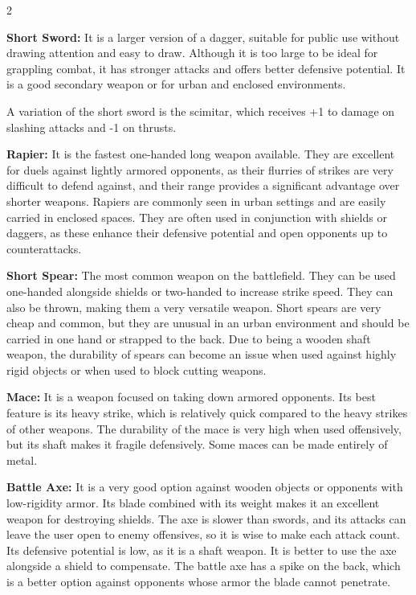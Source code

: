 \begin{multicols}{2}

\textbf{Short Sword:} It is a larger version of a dagger, suitable for public use without drawing attention and easy to draw. Although it is too large to be ideal for grappling combat, it has stronger attacks and offers better defensive potential. It is a good secondary weapon or for urban and enclosed environments. 

A variation of the short sword is the scimitar, which receives +1 to damage on slashing attacks and -1 on thrusts.

\textbf{Rapier:} It is the fastest one-handed long weapon available. They are excellent for duels against lightly armored opponents, as their flurries of strikes are very difficult to defend against, and their range provides a significant advantage over shorter weapons. Rapiers are commonly seen in urban settings and are easily carried in enclosed spaces. They are often used in conjunction with shields or daggers, as these enhance their defensive potential and open opponents up to counterattacks.

\textbf{Short Spear:} The most common weapon on the battlefield. They can be used one-handed alongside shields or two-handed to increase strike speed. They can also be thrown, making them a very versatile weapon. Short spears are very cheap and common, but they are unusual in an urban environment and should be carried in one hand or strapped to the back. Due to being a wooden shaft weapon, the durability of spears can become an issue when used against highly rigid objects or when used to block cutting weapons.

\textbf{Mace:} It is a weapon focused on taking down armored opponents. Its best feature is its heavy strike, which is relatively quick compared to the heavy strikes of other weapons. The durability of the mace is very high when used offensively, but its shaft makes it fragile defensively. Some maces can be made entirely of metal.

\textbf{Battle Axe:} It is a very good option against wooden objects or opponents with low-rigidity armor. Its blade combined with its weight makes it an excellent weapon for destroying shields. The axe is slower than swords, and its attacks can leave the user open to enemy offensives, so it is wise to make each attack count. Its defensive potential is low, as it is a shaft weapon. It is better to use the axe alongside a shield to compensate. The battle axe has a spike on the back, which is a better option against opponents whose armor the blade cannot penetrate.  

\end{multicols}

